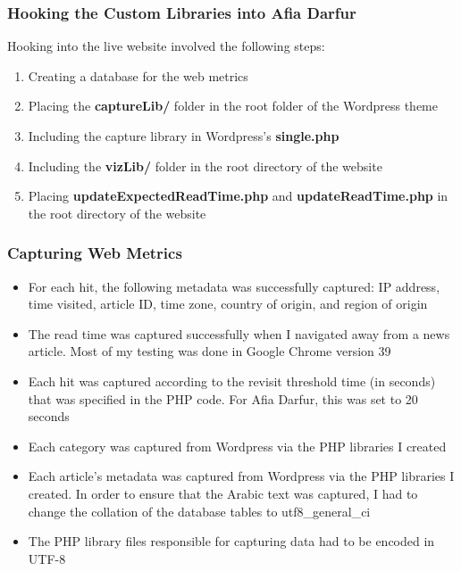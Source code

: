 \documentclass[12pt]{article}
\begin{document}
\subsubsection{Hooking the Custom Libraries into Afia Darfur}
Hooking into the live website involved the following steps:
\begin{enumerate}
\item Creating a database for the web metrics
\item Placing the \textbf{captureLib/} folder in the root folder of the Wordpress theme
\item Including the capture library in Wordpress's \textbf{single.php} 
\item Including the \textbf{vizLib/} folder in the root directory of the website
\item Placing \textbf{updateExpectedReadTime.php} and \textbf{updateReadTime.php} in the root directory of the website 
\end{enumerate}

\subsubsection{Capturing Web Metrics}
\begin{itemize}
\item For each hit, the following metadata was successfully captured: IP address, time visited, article ID, time zone, country of origin, and region of origin
\item  The read time was captured successfully when I navigated away from a news article. Most of my testing was done in Google Chrome version 39
\item Each hit was captured according to the revisit threshold time (in seconds) that was specified in the PHP code. For Afia Darfur, this was set to 20 seconds
\item Each category was captured from Wordpress via the PHP libraries I created
\item Each article's metadata was captured from Wordpress via the PHP libraries I created. In order to ensure that the Arabic text was captured, I had to change the collation of the database tables to utf8\_general\_ci
\item The PHP library files responsible for capturing data had to be encoded in UTF-8
\end{itemize}
\end{document}
